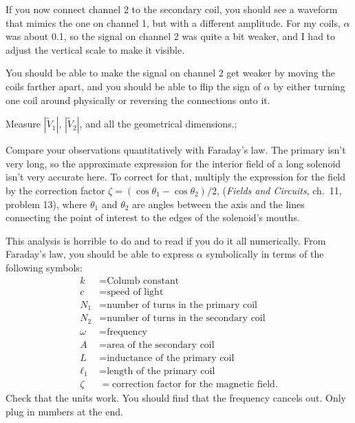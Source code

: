 If you now connect channel 2 to the secondary coil, you should see a waveform
that mimics the one on channel 1, but with a different amplitude. For my coils,
$\alpha$ was about 0.1, so the signal on channel 2 was quite a bit weaker, and I
had to adjust the vertical scale to make it visible.

You should be able to make the signal on channel 2 get weaker by moving the
coils farther apart, and you should be able to flip the sign of $\alpha$
by either turning one coil around physically or reversing the connections
onto it.

Measure $|\tilde{V}_1|$, $|\tilde{V}_2|$, and all the geometrical dimensions.;

\analysis

Compare your observations quantitatively with Faraday's law.
The primary isn't very long, so the approximate expression for the
interior field of a long solenoid isn't very accurate here. To correct
for that, multiply the expression for the field by the correction
factor $\zeta = (\cos\theta_1-\cos\theta_2)/2$,
(\emph{Fields and Circuits}, ch.~11, problem 13), where
$\theta_1$ and $\theta_2$ are angles between the axis and the lines connecting
the point of interest to the edges of the solenoid's mouths.

This analysis is horrible to do and to read if you do it all numerically.
From Faraday's law, you should be able to
express $\alpha$ symbolically in terms of the following
symbols:
\begin{align*}
 k  &= \text{Columb constant} \\
 c  &= \text{speed of light} \\
 N_1  &= \text{number of turns in the primary coil} \\
 N_2  &= \text{number of turns in the secondary coil} \\
 \omega  &= \text{frequency} \\
 A  &= \text{area of the secondary coil} \\
 L  &= \text{inductance of the primary coil} \\
 \ell_1  &= \text{length of the primary coil} \\
 \zeta  &= \text{correction factor for the magnetic field}.
\end{align*}
Check that the units work. You should find that the frequency cancels out.
Only plug in numbers at the end.

